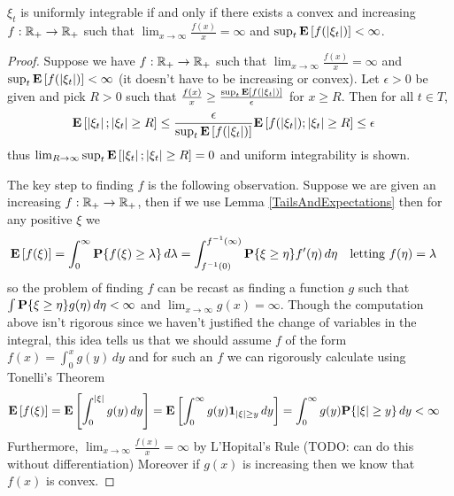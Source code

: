 \begin{lem}$\xi_t$ is uniformly integrable if and only if there exists
  a convex and increasing $f : \mathbb{R}_+ \to \mathbb{R}_+$ such that
  $\lim_{x \to \infty} \frac{f(x)}{x} = \infty$ and $\sup_t
  \textbf{E}\left[f(\left \vert \xi_t \right \vert)\right] < \infty$.
\end{lem}
\begin{proof}
Suppose we have $f : \mathbb{R}_+ \to \mathbb{R}_+$ such that $\lim_{x \to
  \infty} \frac{f(x)}{x} = \infty$ and
$\sup_t  \textbf{E}\left[f(\left \vert \xi_t \right \vert)\right] < \infty$ (it doesn't have to be
increasing or convex).  Let $\epsilon > 0$ be given and pick $R > 0$
such that $\frac{f(x)}{x} \geq \frac{\sup_t \textbf{E}\left[f(\left \vert \xi_t \right \vert)\right]}{\epsilon }$
for $x \geq R$.  Then for all $t \in T$,
\begin{align*}
\textbf{E}\left[\left \vert \xi_t \right \vert; \left \vert \xi_t \right \vert \geq R\right] &\leq
\frac{\epsilon}{\sup_t \textbf{E}\left[f(\left \vert \xi_t \right \vert)\right]}
\textbf{E}\left[f(\left \vert \xi_t \right \vert); \left \vert \xi_t \right \vert \geq R\right] 
\leq \epsilon
\end{align*}
thus $\lim_{R \to \infty} \sup_t  \textbf{E}\left[\left \vert \xi_t \right \vert;
  \left \vert \xi_t \right \vert \geq R\right] = 0$ and uniform integrability is shown.

The key step to finding $f$ is the following observation.  Suppose we
are given an increasing $f : \mathbb{R}_+ \to \mathbb{R}_+$, then if we use
Lemma \ref{TailsAndExpectations} then for any positive $\xi$ we 
\begin{align*}
\textbf{E}\left[f(\xi)\right] &= \int_0^\infty \textbf{P}\{f(\xi) \geq \lambda\} \, d\lambda =
\int_{f^{-1}(0)}^{f^{-1}(\infty)} \textbf{P}\{\xi \geq \eta\} f^\prime(\eta) \, d\eta & &
\text{letting $f(\eta) = \lambda$}
\end{align*}
so the problem of finding $f$ can be recast as finding a function $g$
such that $\int \textbf{P}\{\xi \geq \eta\} g(\eta) \, d\eta < \infty$
and $\lim_{x \to \infty} g(x) = \infty$.  Though the computation above
isn't rigorous since we haven't justified the change of variables in
the integral, this idea tells us that we
should assume $f$ of the form $f(x) = \int_0^x g(y) \, dy$ and for
such an $f$ we can rigorously calculate using Tonelli's Theorem
\begin{align*}
\textbf{E}\left[f(\xi)\right] &= \textbf{E}\left[\int_0^{\left \vert \xi \right \vert} g(y) \, dy\right] =
\textbf{E}\left[\int_0^\infty g(y) \textbf{1}_{\left \vert \xi \right \vert \geq y} \,
  dy\right] = \int_0^\infty g(y) \textbf{P}\{\left \vert \xi \right \vert \geq y\}\,
  dy < \infty
\end{align*}
Furthermore, 
$\lim_{x \to \infty} \frac{f(x)}{x} = \infty$ by L'Hopital's Rule
(TODO: can do this without differentiation)
Moreover if $g(x)$ is increasing then we know that $f(x)$ is convex.


\end{proof}
